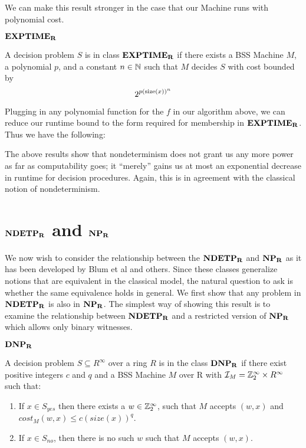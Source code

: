 {We can make this result stronger in the case that our \ndet Machine
runs with polynomial cost.

\begin{definition}{\textbf{$\mathbf{EXPTIME_R}$}}
  
  A decision problem $S$ is in class $\mathbf{EXPTIME_R}$ if there exists a BSS
  Machine $M$, a polynomial $p$, and a constant $n \in \mathbb{N}$ such
  that $M$ decides $S$ with cost bounded by $$2^{p(\text{size}(x))^n}$$
\end{definition}

Plugging in any polynomial function for the $f$ in our algorithm
above, we can reduce our runtime bound to the form required for
membership in $\mathbf{EXPTIME_R}$.  Thus we have the following:

\corollary{$\ndetp \subseteq \exptime$}

\vspace{\baselineskip}

The above results show that nondeterminism does not grant us any more
power as far as computability goes; it ``merely'' gains us at most an
exponential decrease in runtime for decision procedures.  Again, this
is in agreement with the classical notion of nondeterminism.\\

\section{$\mathbf{NDETP_R}$ and $\mathbf{NP_R}$}

We now wish to consider the relationship between the $\mathbf{NDETP_R}$ and
$\mathbf{NP_R}$ as it has been developed by Blum et al and others.  Since these
classes generalize notions that are equivalent in the classical model,
the natural question to ask is whether the same equivalence holds in
general.  We first show that any problem in $\mathbf{NDETP_R}$ is also in $\mathbf{NP_R}$.
The simplest way of showing this result is to examine the relationship
between $\mathbf{NDETP_R}$ and a restricted version of $\mathbf{NP_R}$ which allows only
binary witnesses.

\begin{definition}{\textbf{$\mathbf{DNP_R}$}}
  
  A decision problem $S \subseteq R^\infty$ over a ring $R$ is in the
  class $\mathbf{DNP_R}$ if there exist positive integers $c$ and $q$ and a BSS
  Machine $M$ over R with $\mathcal{I}_M = \mathbb{Z}_2^\infty \times
  R^\infty$ such that:

  \begin{enumerate}
  \item If $x \in S_{yes}$ then there exists a $w \in \mathbb{Z}_2^\infty$, such that
    $M$ accepts $(w, x)$ and $cost_M(w,x) \leq c(size(x))^q$.
  \item If $x \in S_{no}$, then there is no such $w$ such that $M$
    accepts $(w, x)$.
  \end{enumerate}


\end{definition}}
